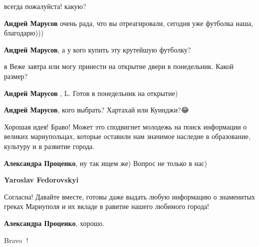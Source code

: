 \begin{itemize} %

всегда пожалуйста! какую? 🙂

\textbf{Андрей Марусов} очень рада, что вы отреагировали, сегодня уже футболка наша, благодарю)))
\end{itemize} %

\textbf{Андрей Марусов}, а у кого купить эту крутейшую футболку?🚀🚀

\begin{itemize} %

в Веже завтра или могу принести на открытие двери в понедельник. Какой размер?

\textbf{Андрей Марусов} , L. Готов в понедельник на открытие)

\textbf{Андрей Марусов}, кого выбрать?
Хартахай или Куинджи?😂
\end{itemize} %


Хорошая идея! Браво! Может это сподвигнет молодежь на поиск информации о
великих мариупольцах, которые оставили нам значимое наследие в образование,
культуру и в развитие города.

\begin{itemize} %
\textbf{Александра Проценко}, ну так ищем же) Вопрос не только в нас)

\textbf{Yaroslav Fedorovskyi} 

Согласна! Давайте вместе, готовы даже выдать любую информацию о знаменитых
греках Мариуполя и их вкладе в равитие нашего любимого города!

\textbf{Александра Проценко}, хорошо.
\end{itemize} %


Bravo 🎉!
